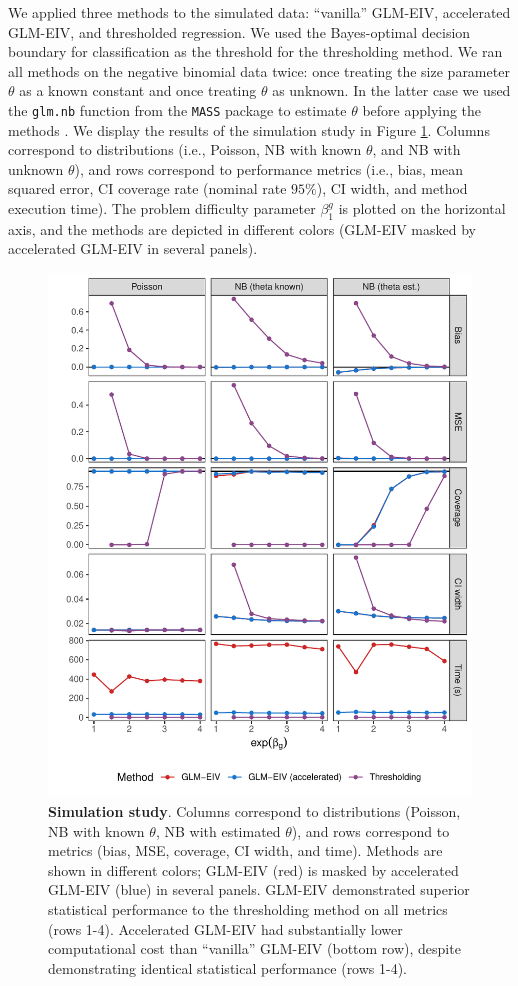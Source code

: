 \documentclass[12pt]{article}
\begin{document}
We applied three methods to the simulated data: ``vanilla'' GLM-EIV, accelerated GLM-EIV, and thresholded regression. We used the Bayes-optimal decision boundary for classification as the threshold for the thresholding method. We ran all methods on the negative binomial data twice: once treating the size parameter $\theta$ as a known constant and once treating $\theta$ as unknown. In the latter case we used the \texttt{glm.nb} function from the \texttt{MASS} package to estimate $\theta$ before applying the methods \parencite{Ripley2013}. We display the results of the simulation study in Figure \ref{main_text_sim}. Columns correspond to distributions (i.e., Poisson, NB with known $\theta$, and NB with unknown $\theta$), and rows correspond to performance metrics (i.e., bias, mean squared error, CI coverage rate (nominal rate $95\%$), CI width, and method execution time). The problem difficulty parameter $\beta^g_1$ is plotted on the horizontal axis, and the methods are depicted in different colors (GLM-EIV masked by accelerated GLM-EIV in several panels).

\begin{figure}[h!]
	\centering
	\includegraphics[width=0.9\linewidth]{figures/main_txt_sim.pdf}
	\caption{\textbf{Simulation study}. Columns correspond to distributions (Poisson, NB with known $\theta$, NB with estimated $\theta$), and rows correspond to metrics (bias, MSE, coverage, CI width, and time). Methods are shown in different colors; GLM-EIV (red) is masked by accelerated GLM-EIV (blue) in several panels. GLM-EIV demonstrated superior statistical performance to the thresholding method on all metrics (rows 1-4). Accelerated GLM-EIV had substantially lower computational cost than ``vanilla'' GLM-EIV (bottom row), despite demonstrating identical statistical performance (rows 1-4).}
	\label{main_text_sim}
\end{figure}
\end{document}
